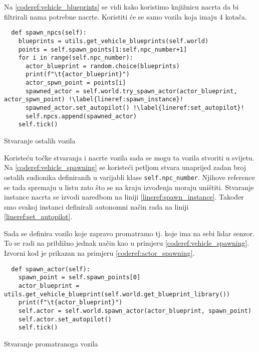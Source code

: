 Na \ref{coderef:vehicle_blueprints} se vidi kako koristimo knjižnicu nacrta da bi filtrirali nama potrebne nacrte. Koristiti će se samo vozila koja imaju 4 kotača.

\begin{listing}[!ht]
  \begin{verbatim}
  def spawn_npcs(self):
    blueprints = utils.get_vehicle_blueprints(self.world)
    points = self.spawn_points[1:self.npc_number+1]
    for i in range(self.npc_number):
      actor_blueprint = random.choice(blueprints)
      print(f"\t{actor_blueprint}")
      actor_spwn_point = points[i]
      spawned_actor = self.world.try_spawn_actor(actor_blueprint, actor_spwn_point) !\label{lineref:spawn_instance}!
      spawned_actor.set_autopilot() !\label{lineref:set_autopilot}!
      self.npcs.append(spawned_actor)
    self.tick()
  \end{verbatim}
  \caption{Stvaranje ostalih vozila}
  \label{coderef:vehicle_spawning}
\end{listing}

Koristeću točke stvaranja i nacrte vozila sada se mogu ta vozila stvoriti u svijetu. Na \ref{coderef:vehicle_spawning} se koristeći petljom stvara unaprijed zadan broj ostalih sudionika definiranih u varijabli klase \texttt{self.npc_number}. Njihove reference se tada spremaju u listu zato što se na kraju izvođenja moraju uništiti. Stvaranje instance nacrta se izvodi naredbom na liniji \ref{lineref:spawn_instance}. Također smo svakoj instanci definirali autonomni način rada na liniji \ref{lineref:set_autopilot}.

Sada se definira vozilo koje zapravo promatramo tj. koje ima na sebi lidar senzor. To se radi na približno jednak način kao u primjeru \ref{coderef:vehicle_spawning}. Izvorni kod je prikazan na primjeru \ref{coderef:actor_spawning}.


\begin{listing}[!ht]
  \begin{verbatim}
  def spawn_actor(self):
    spawn_point = self.spawn_points[0]
    actor_blueprint = utils.get_vehicle_blueprint(self.world.get_blueprint_library())
    print(f"\t{actor_blueprint}")
    self.actor = self.world.spawn_actor(actor_blueprint, spawn_point)
    self.actor.set_autopilot()
    self.tick()
  \end{verbatim}
  \caption{Stvaranje promatranoga vozila}
  \label{coderef:actor_spawning}
\end{listing}

